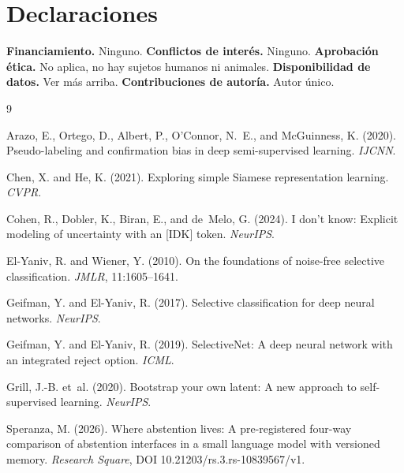 \documentclass[11pt,a4paper]{article}
\begin{document}
\section*{Declaraciones}

\textbf{Financiamiento.} Ninguno. \textbf{Conflictos de interés.} Ninguno. \textbf{Aprobación ética.}
No aplica, no hay sujetos humanos ni animales. \textbf{Disponibilidad de datos.} Ver más arriba.
\textbf{Contribuciones de autoría.} Autor único.


\begin{thebibliography}{9}

Arazo, E., Ortego, D., Albert, P., O'Connor, N.~E., and McGuinness, K. (2020).
Pseudo-labeling and confirmation bias in deep semi-supervised learning.
\emph{IJCNN}.

Chen, X. and He, K. (2021).
Exploring simple Siamese representation learning.
\emph{CVPR}.

Cohen, R., Dobler, K., Biran, E., and de~Melo, G. (2024).
I don't know: Explicit modeling of uncertainty with an [IDK] token.
\emph{NeurIPS}.

El-Yaniv, R. and Wiener, Y. (2010).
On the foundations of noise-free selective classification.
\emph{JMLR}, 11:1605--1641.

Geifman, Y. and El-Yaniv, R. (2017).
Selective classification for deep neural networks.
\emph{NeurIPS}.

Geifman, Y. and El-Yaniv, R. (2019).
SelectiveNet: A deep neural network with an integrated reject option.
\emph{ICML}.

Grill, J.-B. et~al. (2020).
Bootstrap your own latent: A new approach to self-supervised learning.
\emph{NeurIPS}.

Speranza, M. (2026).
Where abstention lives: A pre-registered four-way comparison of abstention interfaces in a small
language model with versioned memory.
\emph{Research Square}, DOI 10.21203/rs.3.rs-10839567/v1.

\end{thebibliography}
\end{document}

